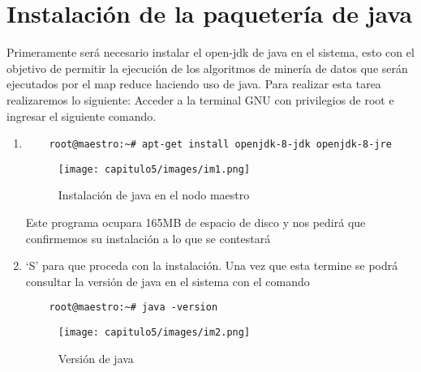 \section{Instalación de la paquetería de java}
Primeramente será necesario instalar el open-jdk de java en el sistema, esto con el objetivo de permitir la ejecución de los algoritmos de minería de datos que serán ejecutados por el map reduce haciendo uso de java. Para realizar esta tarea realizaremos lo siguiente:
Acceder a la terminal GNU con privilegios de root e ingresar el siguiente comando.

\begin{enumerate}
	\item
	\begin{lstlisting} 
	root@maestro:~# apt-get install openjdk-8-jdk openjdk-8-jre
 	\end{lstlisting}

\begin{figure}[!htbp]
	\hypertarget{fig:instalacionjava}{\hspace{1pt}}
	\begin{center}
		\texttt{[image: capitulo5/images/im1.png]}
		\caption{Instalación de java en el nodo maestro}
		\label{fig:instalacionjava}
	\end{center}
\end{figure}

Este programa ocupara 165MB de espacio de disco y nos pedirá que confirmemos su instalación a lo que se contestará 
	\item ‘S’ 
para que proceda con la instalación.
Una vez que esta termine se podrá consultar la versión de java en el sistema con el comando

	\begin{lstlisting} 
	root@maestro:~# java -version
 	\end{lstlisting}
 	
\begin{figure}[!htbp]
	\hypertarget{fig:instalacionjava2}{\hspace{1pt}}
	\begin{center}
		\texttt{[image: capitulo5/images/im2.png]}
		\caption{Versión de java}
		\label{fig:instalacionjava2}
	\end{center}
\end{figure}
\end{enumerate}
